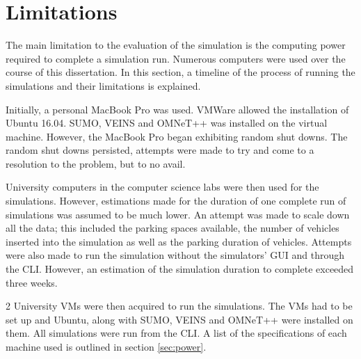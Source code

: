 \section{Limitations}
The main limitation to the evaluation of the simulation is the computing power required to complete a simulation run. Numerous computers were used over the course of this dissertation. In this section, a timeline of the process of running the simulations and their limitations is explained.

Initially, a personal MacBook Pro was used. VMWare allowed the installation of Ubuntu 16.04. \ac{SUMO}, \ac{VEINS} and \ac{OMNeT++} was installed on the virtual machine. However, the MacBook Pro began exhibiting random shut downs. The random shut downs persisted, attempts were made to try and come to a resolution to the problem, but to no avail.

University computers in the computer science labs were then used for the simulations. However, estimations made for the duration of one complete run of simulations was assumed to be much lower. An attempt was made to scale down all the data; this included the parking spaces available, the number of vehicles inserted into the simulation as well as the parking duration of vehicles. Attempts were also made to run the simulation without the simulators' \ac{GUI} and through the \ac{CLI}. However, an estimation of the simulation duration to complete exceeded three weeks.

2 University VMs were then acquired to run the simulations. The VMs had to be set up and Ubuntu, along with \ac{SUMO}, \ac{VEINS} and \ac{OMNeT++} were installed on them. All simulations were run from the \ac{CLI}. A list of the specifications of each machine used is outlined in section \ref{sec:power}.